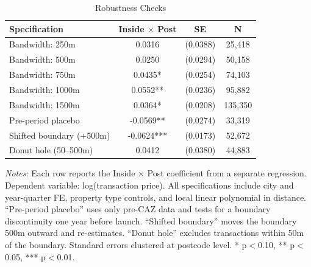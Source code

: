 \begin{table}[htbp]
\centering
\caption{Robustness Checks}
\label{tab:robustness}
\begin{tabular}{lccc}
\hline\hline
Specification & Inside $\times$ Post & SE & N \\
\hline
Bandwidth: 250m & 0.0316 & (0.0388) & 25,418 \\
Bandwidth: 500m & 0.0250 & (0.0294) & 50,158 \\
Bandwidth: 750m & 0.0435* & (0.0254) & 74,103 \\
Bandwidth: 1000m & 0.0552** & (0.0236) & 95,882 \\
Bandwidth: 1500m & 0.0364* & (0.0208) & 135,350 \\
Pre-period placebo & -0.0569** & (0.0274) & 33,319 \\
Shifted boundary (+500m) & -0.0624*** & (0.0173) & 52,672 \\
Donut hole (50--500m) & 0.0412 & (0.0380) & 44,883 \\
\hline
\end{tabular}

\vspace{0.5em}
\begin{minipage}{0.95\textwidth}
\footnotesize
\textit{Notes:} Each row reports the Inside $\times$ Post coefficient from a separate regression. Dependent variable: log(transaction price). All specifications include city and year-quarter FE, property type controls, and local linear polynomial in distance. ``Pre-period placebo'' uses only pre-CAZ data and tests for a boundary discontinuity one year before launch. ``Shifted boundary'' moves the boundary 500m outward and re-estimates. ``Donut hole'' excludes transactions within 50m of the boundary. Standard errors clustered at postcode level. * p$<$0.10, ** p$<$0.05, *** p$<$0.01.
\end{minipage}
\end{table}

